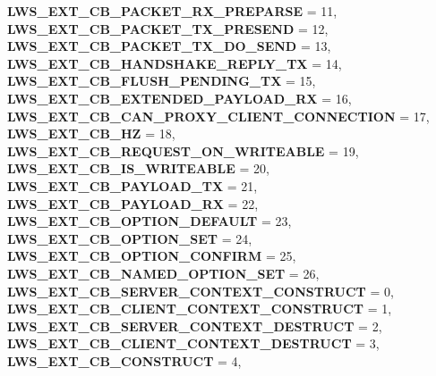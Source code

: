 \begin{DoxyCompactItemize}
{\bfseries L\+W\+S\+\_\+\+E\+X\+T\+\_\+\+C\+B\+\_\+\+P\+A\+C\+K\+E\+T\+\_\+\+R\+X\+\_\+\+P\+R\+E\+P\+A\+R\+SE} = 11, 
\newline
{\bfseries L\+W\+S\+\_\+\+E\+X\+T\+\_\+\+C\+B\+\_\+\+P\+A\+C\+K\+E\+T\+\_\+\+T\+X\+\_\+\+P\+R\+E\+S\+E\+ND} = 12, 
{\bfseries L\+W\+S\+\_\+\+E\+X\+T\+\_\+\+C\+B\+\_\+\+P\+A\+C\+K\+E\+T\+\_\+\+T\+X\+\_\+\+D\+O\+\_\+\+S\+E\+ND} = 13, 
{\bfseries L\+W\+S\+\_\+\+E\+X\+T\+\_\+\+C\+B\+\_\+\+H\+A\+N\+D\+S\+H\+A\+K\+E\+\_\+\+R\+E\+P\+L\+Y\+\_\+\+TX} = 14, 
{\bfseries L\+W\+S\+\_\+\+E\+X\+T\+\_\+\+C\+B\+\_\+\+F\+L\+U\+S\+H\+\_\+\+P\+E\+N\+D\+I\+N\+G\+\_\+\+TX} = 15, 
\newline
{\bfseries L\+W\+S\+\_\+\+E\+X\+T\+\_\+\+C\+B\+\_\+\+E\+X\+T\+E\+N\+D\+E\+D\+\_\+\+P\+A\+Y\+L\+O\+A\+D\+\_\+\+RX} = 16, 
{\bfseries L\+W\+S\+\_\+\+E\+X\+T\+\_\+\+C\+B\+\_\+\+C\+A\+N\+\_\+\+P\+R\+O\+X\+Y\+\_\+\+C\+L\+I\+E\+N\+T\+\_\+\+C\+O\+N\+N\+E\+C\+T\+I\+ON} = 17, 
{\bfseries L\+W\+S\+\_\+\+E\+X\+T\+\_\+\+C\+B\+\_\+HZ} = 18, 
{\bfseries L\+W\+S\+\_\+\+E\+X\+T\+\_\+\+C\+B\+\_\+\+R\+E\+Q\+U\+E\+S\+T\+\_\+\+O\+N\+\_\+\+W\+R\+I\+T\+E\+A\+B\+LE} = 19, 
\newline
{\bfseries L\+W\+S\+\_\+\+E\+X\+T\+\_\+\+C\+B\+\_\+\+I\+S\+\_\+\+W\+R\+I\+T\+E\+A\+B\+LE} = 20, 
{\bfseries L\+W\+S\+\_\+\+E\+X\+T\+\_\+\+C\+B\+\_\+\+P\+A\+Y\+L\+O\+A\+D\+\_\+\+TX} = 21, 
{\bfseries L\+W\+S\+\_\+\+E\+X\+T\+\_\+\+C\+B\+\_\+\+P\+A\+Y\+L\+O\+A\+D\+\_\+\+RX} = 22, 
{\bfseries L\+W\+S\+\_\+\+E\+X\+T\+\_\+\+C\+B\+\_\+\+O\+P\+T\+I\+O\+N\+\_\+\+D\+E\+F\+A\+U\+LT} = 23, 
\newline
{\bfseries L\+W\+S\+\_\+\+E\+X\+T\+\_\+\+C\+B\+\_\+\+O\+P\+T\+I\+O\+N\+\_\+\+S\+ET} = 24, 
{\bfseries L\+W\+S\+\_\+\+E\+X\+T\+\_\+\+C\+B\+\_\+\+O\+P\+T\+I\+O\+N\+\_\+\+C\+O\+N\+F\+I\+RM} = 25, 
{\bfseries L\+W\+S\+\_\+\+E\+X\+T\+\_\+\+C\+B\+\_\+\+N\+A\+M\+E\+D\+\_\+\+O\+P\+T\+I\+O\+N\+\_\+\+S\+ET} = 26, 
{\bfseries L\+W\+S\+\_\+\+E\+X\+T\+\_\+\+C\+B\+\_\+\+S\+E\+R\+V\+E\+R\+\_\+\+C\+O\+N\+T\+E\+X\+T\+\_\+\+C\+O\+N\+S\+T\+R\+U\+CT} = 0, 
\newline
{\bfseries L\+W\+S\+\_\+\+E\+X\+T\+\_\+\+C\+B\+\_\+\+C\+L\+I\+E\+N\+T\+\_\+\+C\+O\+N\+T\+E\+X\+T\+\_\+\+C\+O\+N\+S\+T\+R\+U\+CT} = 1, 
{\bfseries L\+W\+S\+\_\+\+E\+X\+T\+\_\+\+C\+B\+\_\+\+S\+E\+R\+V\+E\+R\+\_\+\+C\+O\+N\+T\+E\+X\+T\+\_\+\+D\+E\+S\+T\+R\+U\+CT} = 2, 
{\bfseries L\+W\+S\+\_\+\+E\+X\+T\+\_\+\+C\+B\+\_\+\+C\+L\+I\+E\+N\+T\+\_\+\+C\+O\+N\+T\+E\+X\+T\+\_\+\+D\+E\+S\+T\+R\+U\+CT} = 3, 
{\bfseries L\+W\+S\+\_\+\+E\+X\+T\+\_\+\+C\+B\+\_\+\+C\+O\+N\+S\+T\+R\+U\+CT} = 4, 
\newline

\end{DoxyCompactItemize}
